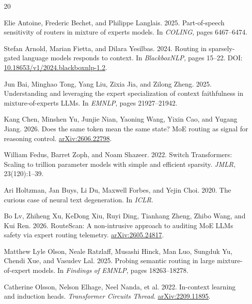 \documentclass[10pt,a4paper,twocolumn]{article}
\begin{document}
\begin{thebibliography}{20}
\footnotesize

Elie Antoine, Frederic Bechet, and Philippe Langlais. 2025. Part-of-speech
sensitivity of routers in mixture of experts models. In \emph{COLING}, pages
6467--6474.

Stefan Arnold, Marian Fietta, and Dilara Yesilbas. 2024. Routing in
sparsely-gated language models responds to context. In \emph{BlackboxNLP}, pages
15--22. DOI: \href{https://doi.org/10.18653/v1/2024.blackboxnlp-1.2}{10.18653/v1/2024.blackboxnlp-1.2}.

Jun Bai, Minghao Tong, Yang Liu, Zixia Jia, and Zilong Zheng. 2025.
Understanding and leveraging the expert specialization of context faithfulness
in mixture-of-experts LLMs. In \emph{EMNLP}, pages 21927--21942.

Kang Chen, Minshen Yu, Junjie Nian, Yaoning Wang, Yixin Cao, and Yugang Jiang.
2026. Does the same token mean the same state? MoE routing as signal for
reasoning control. \href{https://arxiv.org/abs/2606.22798}{arXiv:2606.22798}.

William Fedus, Barret Zoph, and Noam Shazeer. 2022. Switch Transformers:
Scaling to trillion parameter models with simple and efficient sparsity.
\emph{JMLR}, 23(120):1--39.

Ari Holtzman, Jan Buys, Li Du, Maxwell Forbes, and Yejin Choi. 2020. The
curious case of neural text degeneration. In \emph{ICLR}.

Bo Lv, Zhiheng Xu, KeDong Xiu, Ruyi Ding, Tianhang Zheng, Zhibo Wang, and Kui
Ren. 2026. RouteScan: A non-intrusive approach to auditing MoE LLMs safety via
expert routing telemetry. \href{https://arxiv.org/abs/2605.24817}{arXiv:2605.24817}.

Matthew Lyle Olson, Neale Ratzlaff, Musashi Hinck, Man Luo, Sungduk Yu, Chendi
Xue, and Vasudev Lal. 2025. Probing semantic routing in large mixture-of-expert
models. In \emph{Findings of EMNLP}, pages 18263--18278.

Catherine Olsson, Nelson Elhage, Neel Nanda, et al. 2022. In-context learning
and induction heads. \emph{Transformer Circuits Thread}. \href{https://arxiv.org/abs/2209.11895}{arXiv:2209.11895}.


\end{thebibliography}
\end{document}

